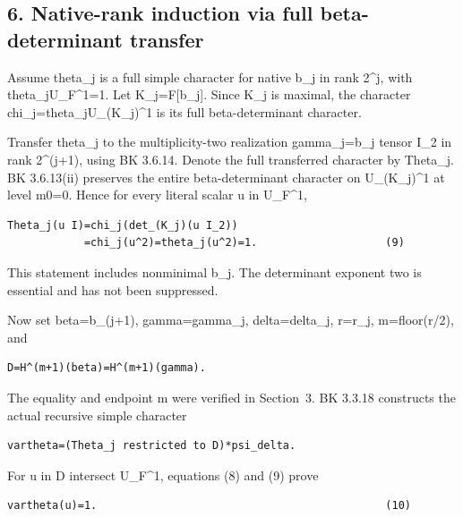 \hypertarget{dyadic_character-native-rank-induction-via-full-beta-determinant-transfer}{%
\subsection{6. Native-rank induction via full beta-determinant
transfer}\label{dyadic_character-native-rank-induction-via-full-beta-determinant-transfer}}

Assume theta\_j is a full simple character for native b\_j in rank
2\^{}j, with theta\_j\textbar U\_F\^{}1=1. Let K\_j=F{[}b\_j{]}. Since
K\_j is maximal, the character chi\_j=theta\_j\textbar U\_(K\_j)\^{}1 is
its full beta-determinant character.

Transfer theta\_j to the multiplicity-two realization gamma\_j=b\_j
tensor I\_2 in rank 2\^{}(j+1), using BK 3.6.14. Denote the full
transferred character by Theta\_j. BK 3.6.13(ii) preserves the entire
beta-determinant character on U\_(K\_j)\^{}1 at level m0=0. Hence for
every literal scalar u in U\_F\^{}1,

\begin{Verbatim}[fontsize=\small,breaklines=true,breakanywhere=true]
Theta_j(u I)=chi_j(det_(K_j)(u I_2))
            =chi_j(u^2)=theta_j(u^2)=1.                    (9)
\end{Verbatim}

This statement includes nonminimal b\_j. The determinant exponent two is
essential and has not been suppressed.

Now set beta=b\_(j+1), gamma=gamma\_j, delta=delta\_j, r=r\_j,
m=floor(r/2), and

\begin{Verbatim}[fontsize=\small,breaklines=true,breakanywhere=true]
D=H^(m+1)(beta)=H^(m+1)(gamma).
\end{Verbatim}

The equality and endpoint m were verified in Section~3. BK 3.3.18
constructs the actual recursive simple character

\begin{Verbatim}[fontsize=\small,breaklines=true,breakanywhere=true]
vartheta=(Theta_j restricted to D)*psi_delta.
\end{Verbatim}

For u in D intersect U\_F\^{}1, equations (8) and (9) prove

\begin{Verbatim}[fontsize=\small,breaklines=true,breakanywhere=true]
vartheta(u)=1.                                             (10)
\end{Verbatim}


